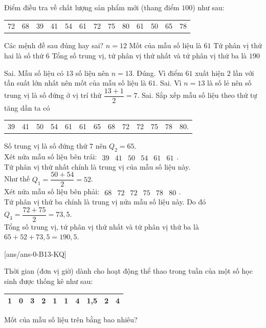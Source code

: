 \begin{ex}%
Điểm điều tra về chất lượng sản phẩm mới (thang điểm $100$) như sau:
\begin{center}
\begin{tabular}{lllllllllllll}72 & 68 & 39 & 41 & 54 & 61 & 72 & 75 & 80 & 61 & 50 & 65 & 78\end{tabular}
\end{center}
Các mệnh đề sau đúng hay sai?
\choiceTF 
{$n=12$}
{\True Mốt của mẫu số liệu là $61$}
{Tứ phân vị thứ hai là số thứ $6$}
{Tổng số trung vị, tứ phân vị thứ nhất và tứ phân vị thứ ba là $190$}
\loigiai
{\begin{itemchoice}
\itemch Sai. Mẫu số liệu có $13$ số liệu nên $n=13$.
\itemch Đúng. Vì điểm $61$ xuất hiện $2$  lần với tần suất lớn nhất nên mốt của mẫu số liệu là $61$.
\itemch Sai. Vì $n=13$ là số lẻ nên số trung vị là số đứng ở vị trí thứ $\dfrac{13+1}{2}=7$.
\itemch Sai. Sắp xếp mẫu số liệu theo thứ tự tăng dần ta có
\begin{center}
\begin{tabular}{lllllllllllll}
39 & 41 & 50 & 54 & 61 & 61 & 65 & 68 & 72 & 72 & 75 & 78 & 80.
\end{tabular}
\end{center}
Số trung vị là số đứng thứ $7$ nên $Q_2=65$.\\
Xét nửa mẫu số liệu bên trái: $\begin{array}{llllll}39 & 41 & 50 & 54 & 61 & 61\end{array}$.\\
Tứ phân vị thứ nhất chính là trung vị của mẫu số liệu này.\\ Như thế $Q_1=\dfrac{50+54}{2}=52$.\\
 Xét nửa mẫu số liệu bên phải: $\begin{array}{llllll}68 & 72 & 72 & 75 & 78 & 80\end{array}$.\\
Tứ phân vị thứ ba chính là trung vị nửa mẫu số liệu này. Do đó $Q_3=\dfrac{72+75}{2}=73{,}5$.\\
Tổng số trung vị, tứ phân vị thứ nhất và tứ phân vị thứ ba là $65+52+73{,}5=190{,}5$.
\end{itemchoice}
}
\end{ex}


[ans/ans-0-B13-KQ]
\caukq
\begin{ex}%
Thời gian (đơn vị giờ) dành cho hoạt động thể thao trong tuần của một số học sinh được thống kê như sau:
\begin{center}
\begin{tabular}{|l|l|l|l|l|l|l|l|l|l|}
\hline 1 & 0 & 3 & 2 & 1 & 1 & 4 & 1,5 & 2 & 4 \\
\hline
\end{tabular}
\end{center}
Mốt của mẫu số liệu trên bằng bao nhiêu?
\end{ex}

